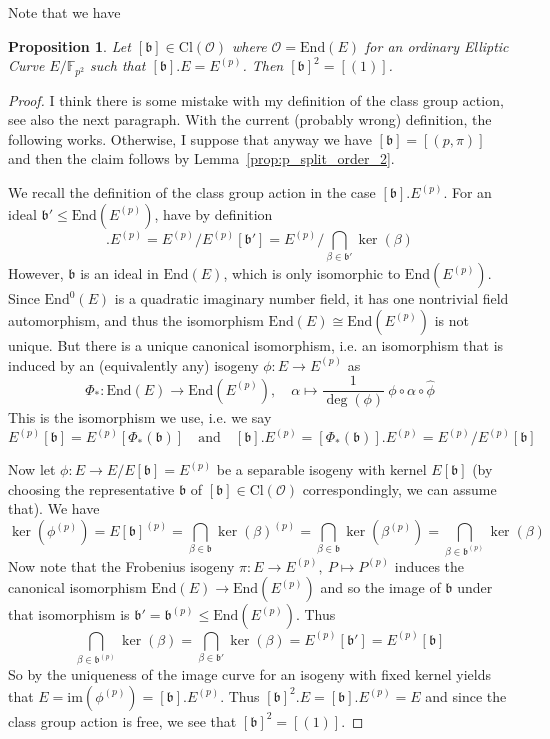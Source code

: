 \documentclass{scrartcl}
\newcommand{\F}{\mathbb{F}}
\newcommand{\End}{\mathrm{End}}
\newcommand{\Cl}{\mathrm{Cl}}
\renewcommand{\b}{\mathfrak{b}}
\renewcommand{\O}{\mathcal{O}}
\newtheorem{prop}{Proposition}[section]
\theoremstyle{definition}
\begin{document}
Note that we have
\begin{prop}
    Let $[\b] \in \Cl(\O)$ where $\O = \End(E)$ for an ordinary Elliptic Curve $E/\F_{p^2}$ such that $[\b].E = E^{(p)}$.
    Then $[\b]^2 = [(1)]$.
\end{prop}
\begin{proof}
    I think there is some mistake with my definition of the class group action, see also the next paragraph.
    With the current (probably wrong) definition, the following works.
    Otherwise, I suppose that anyway we have $[\b] = [(p, \pi)]$ and then the claim follows by Lemma~\ref{prop:p_split_order_2}.

    We recall the definition of the class group action in the case $[\b].E^{(p)}$.
    For an ideal $\b' \leq \End(E^{(p)})$, have by definition
    \begin{equation*}
        [\b'].E^{(p)} = E^{(p)} / E^{(p)}[\b'] = E^{(p)} / \bigcap_{\beta \in \b'} \ker(\beta)
    \end{equation*}
    However, $\b$ is an ideal in $\End(E)$, which is only isomorphic to $\End(E^{(p)})$.
    Since $\End^0(E)$ is a quadratic imaginary number field, it has one nontrivial field automorphism, and thus the isomorphism $\End(E) \cong \End(E^{(p)})$ is not unique.
    But there is a unique canonical isomorphism, i.e. an isomorphism that is induced by an (equivalently any) isogeny $\phi: E \to E^{(p)}$ as
    \begin{equation*}
        \Phi_*: \End(E) \to \End(E^{(p)}), \quad \alpha \mapsto \frac 1 {\deg(\phi)} \ \phi \circ \alpha \circ \hat{\phi}
    \end{equation*}
    This is the isomorphism we use, i.e. we say
    \begin{equation*}
        E^{(p)}[\b] = E^{(p)}[\Phi_*(\b)] \quad \text{and} \quad [\b].E^{(p)} = [\Phi_*(\b)].E^{(p)} = E^{(p)}/E^{(p)}[\b]
    \end{equation*}

    Now let $\phi: E \to E/E[\b] = E^{(p)}$ be a separable isogeny with kernel $E[\b]$ (by choosing the representative $\b$ of $[\b] \in \Cl(\O)$ correspondingly, we can assume that).
    We have
    \begin{equation*}
        \ker(\phi^{(p)}) = E[\b]^{(p)} = \bigcap_{\beta \in \b} \ker(\beta)^{(p)} = \bigcap_{\beta \in \b} \ker(\beta^{(p)}) = \bigcap_{\beta \in \b^{(p)}} \ker(\beta)
    \end{equation*}
    Now note that the Frobenius isogeny $\pi: E \to E^{(p)}, \ P \mapsto P^{(p)}$ induces the canonical isomorphism $\End(E) \to \End(E^{(p)})$ and so the image of $\b$ under that isomorphism is $\b' = \b^{(p)} \leq \End(E^{(p)})$.
    Thus
    \begin{equation*}
        \bigcap_{\beta \in \b^{(p)}} \ker(\beta) = \bigcap_{\beta \in \b'} \ker(\beta) = E^{(p)}[\b'] = E^{(p)}[\b]
    \end{equation*}
    So by the uniqueness of the image curve for an isogeny with fixed kernel yields that $E = \mathrm{im}(\phi^{(p)}) = [\b].E^{(p)}$.
    Thus $[\b]^2.E = [\b].E^{(p)} = E$ and since the class group action is free, we see that $[\b]^2 = [(1)]$.
\end{proof}
\end{document}
